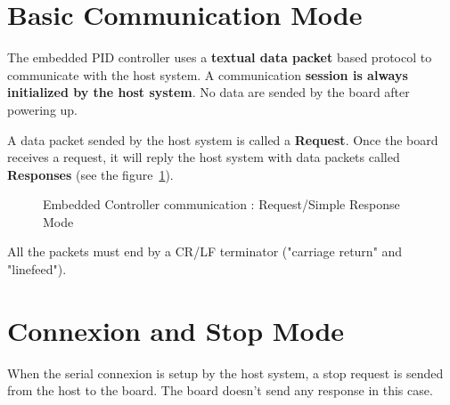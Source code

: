 \documentclass[14pt,fleqn]{book} %
\begin{document}
\section{Basic Communication Mode}

The embedded PID controller uses a \textbf{textual data packet} based protocol to communicate with the host system. A communication \textbf{session is always initialized by the host system}. No data are sended by the board after powering up.

A data packet sended by the host system is called a \textbf{Request}. Once the board receives a request, it will reply the host system with data packets called \textbf{Responses} (see the figure~\ref{fig:rs232_RSR_mode}).

\begin{figure}[h!]
\centering
{}
\caption{Embedded Controller communication : Request/Simple Response Mode} \label{fig:rs232_RSR_mode}
\end{figure}

\begin{remark}
All the packets must end by a CR/LF terminator ("carriage return" and "linefeed").
\end{remark}

\section{Connexion and Stop Mode}

When the serial connexion is setup by the host system, a stop request is sended from the host to the board. The board doesn't send any response in this case.
\end{document}
